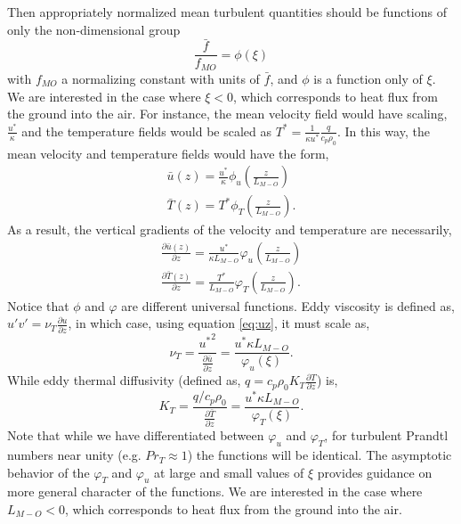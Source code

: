 Then appropriately normalized mean turbulent quantities should be
functions of only the non-dimensional group 
\begin{equation}
 \frac{\bar f}{f_{MO}} = \phi(\xi)
\end{equation}
with $f_{MO}$ a normalizing constant with units of $\bar f$, and $\phi$ is a
function only of $\xi$. We are interested in the case where $\xi<0$, which
corresponds to heat flux from the ground into the air.
For instance, the mean velocity field would have
scaling, $\frac{u^*}{\kappa}$ and the temperature fields would be scaled
as $T^* = \frac{1}{\kappa u^*} \frac{q}{c_p \rho_0}$. In this way, the
mean velocity and temperature fields would have the form, 
\begin{eqnarray}
\bar u(z) = \frac{u^*}{\kappa} \phi_u(\frac{z}{L_{M-O}}) \\
\bar T(z) = T^* \phi_T(\frac{z}{L_{M-O}}).
\end{eqnarray}
As a result, the vertical gradients of the velocity and temperature are
necessarily, 
\begin{eqnarray}
\frac{\partial \bar u(z)}{\partial z} = \frac{u^*}{\kappa L_{M-O}}
 \varphi_u(\frac{z}{L_{M-O}}) \label{eq:uz} \\ 
\frac{\partial \bar T(z)}{\partial z} = \frac{T^*}{L_{M-O}}
 \varphi_T(\frac{z}{L_{M-O}}) \label{eq:tz}.
\end{eqnarray}
Notice that $\phi$ and $\varphi$ are different universal functions. Eddy
viscosity is defined as, $u'v' = \nu_T \frac{\partial
u}{\partial z}$\cite{durbin2001statistical}, in which case, using
equation \ref{eq:uz}, it must scale as,  
\begin{equation}
 \nu_T = \frac{{u^*}^2}{\frac{\partial \bar u}{\partial z}} = \frac{u^*
  \kappa L_{M-O}}{\varphi_u(\xi)}.
\end{equation}
While eddy thermal diffusivity (defined as, $q = c_p \rho_0 K_T \frac{\partial T}{\partial
z}$) is, 
\begin{equation}
 K_T = \frac{q/c_p \rho_0}{\frac{\partial \bar T}{\partial z}} = \frac{u^*
  \kappa L_{M-O}}{\varphi_T(\xi)}.
\label{eqn:eddy_kt}
\end{equation}
Note that while we have differentiated between $\varphi_u$ and
$\varphi_T$, for turbulent Prandtl numbers near unity (e.g. $Pr_T
\approx 1$) the functions will be identical. The asymptotic behavior of
the $\varphi_T$ and $\varphi_u$ at 
large and small values of $\xi$ provides guidance on more general character of the
functions. We are interested in the case where $L_{M-O}<0$, which corresponds to 
heat flux from the ground into the air. 
%


